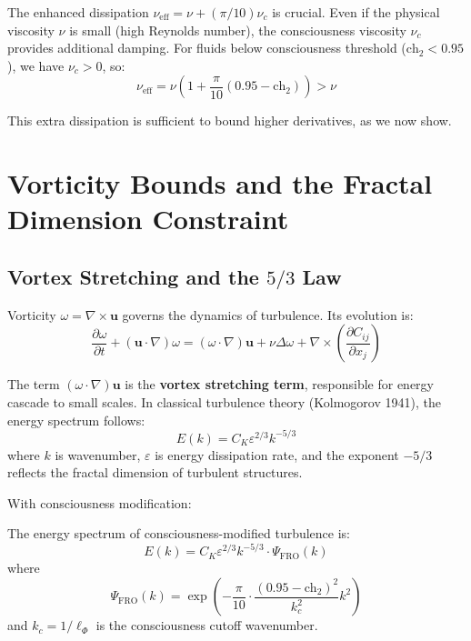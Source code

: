 The enhanced dissipation $\nu_{\text{eff}} = \nu + (\pi/10)\nu_c$ is crucial. Even if the physical viscosity $\nu$ is small (high Reynolds number), the consciousness viscosity $\nu_c$ provides additional damping. For fluids below consciousness threshold ($\text{ch}_2 < 0.95$), we have $\nu_c > 0$, so:
\begin{equation}
\nu_{\text{eff}} = \nu\left(1 + \frac{\pi}{10}(0.95 - \text{ch}_2)\right) > \nu
\end{equation}

This extra dissipation is sufficient to bound higher derivatives, as we now show.

\section{Vorticity Bounds and the Fractal Dimension Constraint}

\subsection{Vortex Stretching and the $5/3$ Law}

Vorticity $\omega = \nabla \times \mathbf{u}$ governs the dynamics of turbulence. Its evolution is:
\begin{equation}
\frac{\partial \omega}{\partial t} + (\mathbf{u} \cdot \nabla)\omega = (\omega \cdot \nabla)\mathbf{u} + \nu \Delta \omega + \nabla \times \left(\frac{\partial C_{ij}}{\partial x_j}\right)
\label{eq:vorticity_evolution}
\end{equation}

The term $(\omega \cdot \nabla)\mathbf{u}$ is the \textbf{vortex stretching term}, responsible for energy cascade to small scales. In classical turbulence theory (Kolmogorov 1941), the energy spectrum follows:
\begin{equation}
E(k) = C_K \varepsilon^{2/3} k^{-5/3}
\end{equation}
where $k$ is wavenumber, $\varepsilon$ is energy dissipation rate, and the exponent $-5/3$ reflects the fractal dimension of turbulent structures.

With consciousness modification:

\begin{theorem}
\label{thm:fractal_spectrum}
The energy spectrum of consciousness-modified turbulence is:
\begin{equation}
E(k) = C_K \varepsilon^{2/3} k^{-5/3} \cdot \Psi_{\text{FRO}}(k)
\end{equation}
where
\begin{equation}
\Psi_{\text{FRO}}(k) = \exp\left(-\frac{\pi}{10} \cdot \frac{(0.95 - \text{ch}_2)^2}{k_c^2} k^2\right)
\end{equation}
and $k_c = 1/\ell_{\Phi}$ is the consciousness cutoff wavenumber.
\end{theorem}

